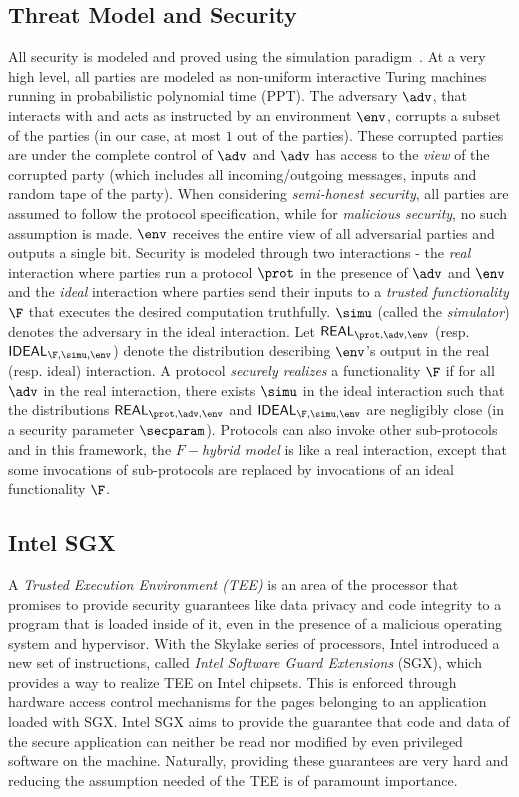 \subsection{Threat Model and Security}

All security is modeled and proved using the simulation paradigm~\cite{gmw,canetti00}. At a very high level, all parties are modeled as non-uniform interactive Turing machines running in probabilistic polynomial time (PPT). The adversary $\adv$, that interacts with and acts as instructed by an environment $\env$, corrupts a subset of the parties (in our case, at most $1$ out of the parties). These corrupted parties are under the complete control of $\adv$ and $\adv$ has access to the {\em view} of the corrupted party (which includes all incoming/outgoing messages, inputs and random tape of the party). When considering {\em semi-honest security}, all parties are assumed to follow the protocol specification, while for {\em malicious security}, no such assumption is made. $\env$ receives the entire view of all adversarial parties and outputs a single bit. Security is modeled through two interactions - the {\em real} interaction where parties run a protocol $\prot$ in the presence of $\adv$ and  $\env$ and the {\em ideal} interaction where parties send their inputs to a {\em trusted functionality} $\F$ that executes the desired computation truthfully. $\simu$ (called the {\em simulator}) denotes the adversary in the ideal interaction. Let $\mathsf{REAL}_{\prot,\adv,\env}$ (resp. $\mathsf{IDEAL}_{\F,\simu,\env}$) denote the distribution describing $\env$'s output in the real (resp. ideal) interaction. A protocol {\em securely realizes} a functionality $\F$ if for all $\adv$ in the real interaction, there exists $\simu$ in the ideal interaction such that the distributions $\mathsf{REAL}_{\prot,\adv,\env}$ and  $\mathsf{IDEAL}_{\F,\simu,\env}$ are negligibly close (in a security parameter $\secparam$). Protocols can also invoke other sub-protocols and in this framework, the {\em $F-$hybrid model} is like a real interaction, except that some invocations of sub-protocols are replaced by invocations of an ideal functionality $\F$.

\subsection{Intel SGX}

A {\em Trusted Execution Environment (TEE)} is an area of the processor that promises to provide security guarantees like data privacy and code integrity to a program that is loaded inside of it, even in the presence of a malicious operating system and hypervisor. With the Skylake series of processors, Intel introduced a new set of instructions, called {\em Intel Software Guard Extensions} (SGX), which provides a way to realize TEE on Intel chipsets. This is enforced through hardware access control mechanisms for the pages belonging to an application loaded with SGX. Intel SGX aims to provide the guarantee that code and data of the secure application can neither be read nor modified by even privileged software on the machine. Naturally, providing these guarantees are very hard and reducing the assumption needed of the TEE is of paramount importance. 

